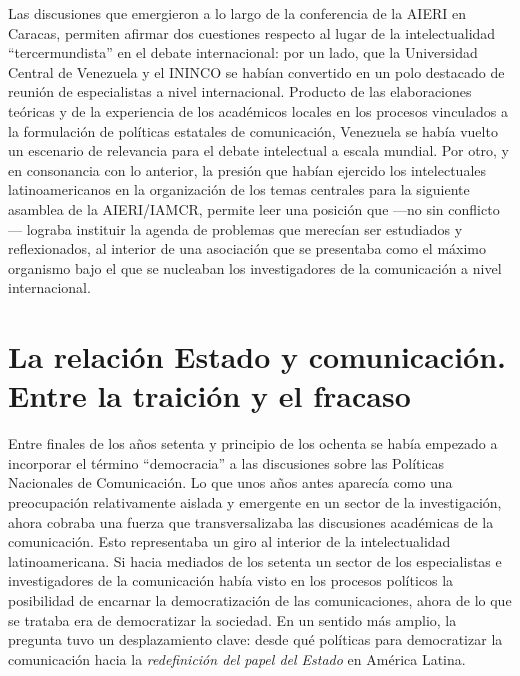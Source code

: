 \documentclass{tufte-handout}
\begin{document}
Las discusiones que emergieron a lo largo de la conferencia de la AIERI
en Caracas, permiten afirmar dos cuestiones respecto al lugar de la
intelectualidad ``tercermundista'' en el debate internacional: por un
lado, que la Universidad Central de Venezuela y el ININCO se habían
convertido en un polo destacado de reunión de especialistas a nivel
internacional. Producto de las elaboraciones teóricas y de la
experiencia de los académicos locales en los procesos vinculados a la
formulación de políticas estatales de comunicación, Venezuela se había
vuelto un escenario de relevancia para el debate intelectual a escala
mundial. Por otro, y en consonancia con lo anterior, la presión que
habían ejercido los intelectuales latinoamericanos en la organización de
los temas centrales para la siguiente asamblea de la AIERI/IAMCR,
permite leer una posición que ---no sin conflicto--- lograba instituir
la agenda de problemas que merecían ser estudiados y reflexionados, al
interior de una asociación que se presentaba como el máximo organismo
bajo el que se nucleaban los investigadores de la comunicación a nivel
internacional.

\hypertarget{la-relacin-estado-y-comunicacin-entre-la-traicin-y-el-fracaso}{%
\section{La relación Estado y comunicación. Entre la traición y el
fracaso}\label{la-relacin-estado-y-comunicacin-entre-la-traicin-y-el-fracaso}}

Entre finales de los años setenta y principio de los ochenta se había
empezado a incorporar el término ``democracia'' a las discusiones sobre
las Políticas Nacionales de Comunicación. Lo que unos años antes
aparecía como una preocupación relativamente aislada y emergente en un
sector de la investigación, ahora cobraba una fuerza que
transversalizaba las discusiones académicas de la comunicación. Esto
representaba un giro al interior de la intelectualidad latinoamericana.
Si hacia mediados de los setenta un sector de los especialistas e
investigadores de la comunicación había visto en los procesos políticos
la posibilidad de encarnar la democratización de las comunicaciones,
ahora de lo que se trataba era de democratizar la sociedad. En un
sentido más amplio, la pregunta tuvo un desplazamiento clave: desde qué
políticas para democratizar la comunicación hacia la \emph{redefinición
del papel del Estado} en América Latina.
\end{document}
